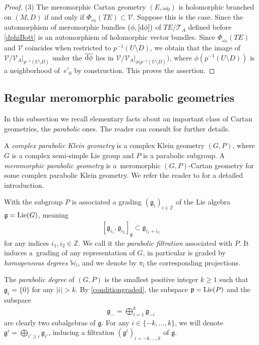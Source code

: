 \documentclass[pdftex]{sigma}
\numberwithin{equation}{section}
\begin{document}
\begin{proof}
(3) The meromorphic Cartan geometry $(E,\omega_0)$ is holomorphic branched on $(M,D)$ if and only if $\Phi_{\omega_0}(TE)\subset \mathcal{V}$. Suppose this is the case. Since the automorphism of meromorphic bundles $(\phi,[{\rm d}\phi])$ of $TE/\mathcal{T}_A$ defined before \eqref{dphiBott} is an automorphism of holomorphic vector bundles. Since $\Phi_{\omega_0}(TE)$ and $\mathcal{V}$ coincides when restricted to $p^{-1}(U\setminus D)$, we obtain that the image of $\mathcal{V}/\mathcal{V}_A\vert_{p^{-1}(U\setminus D)}$ under the $\overline{{\rm d}\phi}$ lies in $\mathcal{V}/\mathcal{V}_A\vert_{\phi(p^{-1}(U\setminus D)})$, where $\phi(p^{-1}(U\setminus D))$ is a neighborhood of~$e'_0$ by construction. This proves the assertion.
\end{proof}

\subsection{ Regular meromorphic parabolic geometries}\label{sectionparabolique}
In this subsection we recall elementary facts about an important class of Cartan geometries, the \textit{parabolic} ones. The reader can consult \cite{Cap} for further details.

 A \textit{complex parabolic Klein geometry} is a complex Klein geometry $(G,P)$, where $G$ is a complex semi-simple Lie group and $P$ is a parabolic subgroup. A \textit{meromorphic parabolic geometry} is a~meromorphic $(G,P)$-Cartan geometry for some complex parabolic Klein geometry. We refer the reader to \cite{Cap} for a detailed introduction.

 With the subgroup $P$ is associated a grading $(\mathfrak{g}_i)_{i\in \mathbb{Z}}$ of the Lie algebra $\mathfrak{g}={\rm Lie}(G)$, meaning%
  \begin{gather}\label{conditiongraded}[\mathfrak{g}_{i_1},\mathfrak{g}_{i_2}]_\mathfrak{g} \subset \mathfrak{g}_{i_1+i_2}\end{gather}
 for any indices $i_1,i_2\in \mathbb{Z}$. We call it the \textit{parabolic filtration} associated with $P$. It induces a~grading of any representation of $G$, in particular  is graded by \textit{homogeneous degrees} $\mathbb{W}_l$, and we denote by $\pi_l$ the corresponding projections.

 The \textit{parabolic degree} of $(G,P)$ is the smallest positive integer $k\geq 1$ such that $\mathfrak{g}_i =\{0\}$ for any $\vert i\vert>k$. By \eqref{conditiongraded}, the subspace $\mathfrak{p}={\rm Lie}(P)$ and the subspace
 \begin{gather*}%
 \mathfrak{g}_- = \bigoplus_{i=1}^{k}  \mathfrak{g}_{-i} \end{gather*}
 are clearly two subalgebras of $\mathfrak{g}$. For any $i\in \{-k,\dots,k\}$, we will denote $\mathfrak{g}^i = \bigoplus_{i'\geq i} \mathfrak{g}_{i'}$, inducing a filtration $(\mathfrak{g}^i)_{i=-k,\dots,k}$ of $\mathfrak{g}$.
\end{document}
